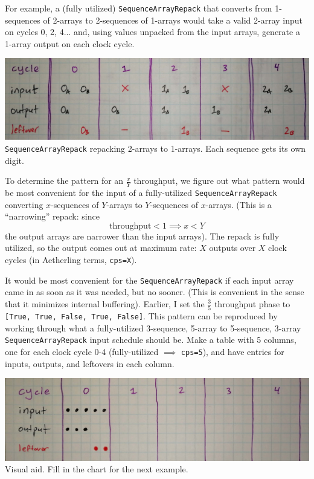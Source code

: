 \documentclass[12pt]{article}
\begin{document}
For example, a (fully utilized) \texttt{SequenceArrayRepack} that converts
from 1-sequences of 2-arrays to 2-sequences of 1-arrays would take a
valid 2-array input on cycles 0, 2, 4... and, using values unpacked from
the input arrays, generate a 1-array output on each clock cycle.

\begin{center}
\includegraphics[width=1.0\linewidth]{Figures/repack.jpg}
\texttt{SequenceArrayRepack} repacking 2-arrays to 1-arrays.
Each sequence gets its own digit.
\end{center}

To determine the pattern for an $\frac{x}{Y}$ throughput, we figure out
what pattern would be most convenient for the input of a fully-utilized
\texttt{SequenceArrayRepack} converting $x$-sequences of $Y$-arrays
to $Y$-sequences of $x$-arrays. (This is a ``narrowing'' repack: since
\begin{equation*}
    \text{throughput}<1 \implies x<Y
\end{equation*}
the output arrays are narrower than
the input arrays). The repack is fully utilized, so the output comes
out at maximum rate: $X$ outputs over $X$ clock cycles (in Aetherling
terms, \texttt{cps=X}).

It would be most convenient for the \texttt{SequenceArrayRepack} if
each input array came in as soon as it was needed, but no sooner.
(This is convenient in the sense that it minimizes internal
buffering). Earlier, I set the $\frac{3}{5}$ throughput phase to
\texttt{[True, True, False, True, False]}. This pattern can be
reproduced by working through what a fully-utilized 3-sequence,
5-array to 5-sequence, 3-array \texttt{SequenceArrayRepack} input
schedule should be. Make a table with 5 columns, one for each clock
cycle 0-4 (fully-utilized $\implies$ \texttt{cps=5}), and have entries
for inputs, outputs, and leftovers in each column.

\begin{center}
\includegraphics[width=1.0\linewidth]{Figures/sorry-if-patronizing.jpg}
Visual aid. Fill in the chart for the next example.
\end{center}
\end{document}

